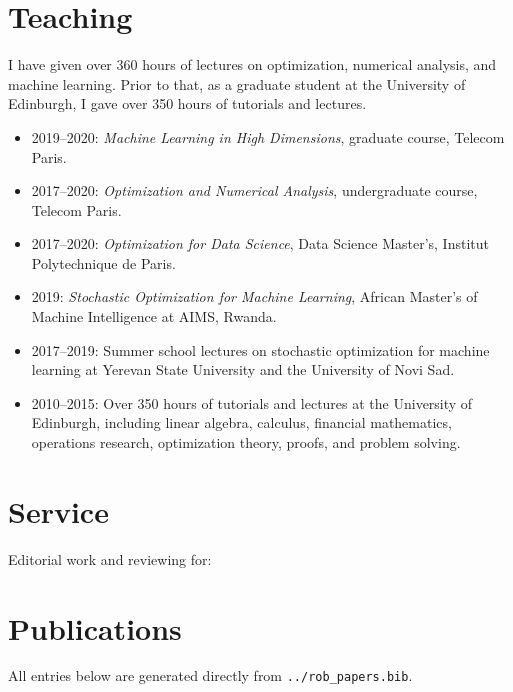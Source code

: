 \documentclass[10pt,letterpaper]{article}
\begin{document}
\section{Teaching}
I have given over 360 hours of lectures on optimization, numerical analysis, and machine learning. Prior to that, as a graduate student at the University of Edinburgh, I gave over 350 hours of tutorials and lectures.
\begin{itemize}
\item 2019--2020: \emph{Machine Learning in High Dimensions}, graduate course, Telecom Paris.
\item 2017--2020: \emph{Optimization and Numerical Analysis}, undergraduate course, Telecom Paris.
\item 2017--2020: \emph{Optimization for Data Science}, Data Science Master's, Institut Polytechnique de Paris.
\item 2019: \emph{Stochastic Optimization for Machine Learning}, African Master's of Machine Intelligence at AIMS, Rwanda.
\item 2017--2019: Summer school lectures on stochastic optimization for machine learning at Yerevan State University and the University of Novi Sad.
\item 2010--2015: Over 350 hours of tutorials and lectures at the University of Edinburgh, including linear algebra, calculus, financial mathematics, operations research, optimization theory, proofs, and problem solving.
\end{itemize}

\section{Service}
Editorial work and reviewing for:


\section{Publications}
All entries below are generated directly from \texttt{../rob\_papers.bib}.
\nocite{*}
\printbibliography[heading=none]
\end{document}
